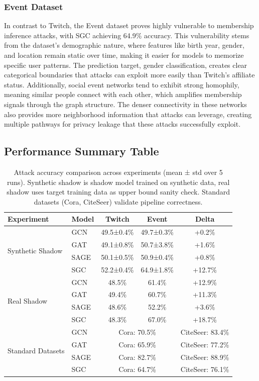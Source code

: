 \documentclass{article}
\begin{document}
\subsubsection{Event Dataset}
In contrast to Twitch, the Event dataset proves highly vulnerable to membership inference attacks, with SGC achieving 64.9\% accuracy. This vulnerability stems from the dataset's demographic nature, where features like birth year, gender, and location remain static over time, making it easier for models to memorize specific user patterns. The prediction target, gender classification, creates clear categorical boundaries that attacks can exploit more easily than Twitch's affiliate status. Additionally, social event networks tend to exhibit strong homophily, meaning similar people connect with each other, which amplifies membership signals through the graph structure. The denser connectivity in these networks also provides more neighborhood information that attacks can leverage, creating multiple pathways for privacy leakage that these attacks successfully exploit.

\subsection{Performance Summary Table}

\begin{table}[H]
\centering
\caption{Attack accuracy comparison across experiments (mean ± std over 5 runs). Synthetic shadow is shadow model trained on synthetic data, real shadow uses target training data as upper bound sanity check. Standard datasets (Cora, CiteSeer) validate pipeline correctness.}
\label{tab:performance}
\begin{tabular}{|l|l|c|c|c|}
\hline
\textbf{Experiment} & \textbf{Model} & \textbf{Twitch} & \textbf{Event} & \textbf{Delta} \\
\hline
\multirow{4}{*}{Synthetic Shadow} & GCN & 49.5±0.4\% & 49.7±0.3\% & +0.2\% \\
 & GAT & 49.1±0.8\% & 50.7±3.8\% & +1.6\% \\
 & SAGE & 50.1±0.5\% & 50.9±0.4\% & +0.8\% \\
 & SGC & 52.2±0.4\% & 64.9±1.8\% & +12.7\% \\
\hline
\multirow{4}{*}{Real Shadow} & GCN & 48.5\% & 61.4\% & +12.9\% \\
 & GAT & 49.4\% & 60.7\% & +11.3\% \\
 & SAGE & 48.6\% & 52.2\% & +3.6\% \\
 & SGC & 48.3\% & 67.0\% & +18.7\% \\
\hline
\multirow{4}{*}{Standard Datasets} & GCN & \multicolumn{2}{c|}{Cora: 70.5\%} & CiteSeer: 83.4\% \\
 & GAT & \multicolumn{2}{c|}{Cora: 65.9\%} & CiteSeer: 77.2\% \\
 & SAGE & \multicolumn{2}{c|}{Cora: 82.7\%} & CiteSeer: 88.9\% \\
 & SGC & \multicolumn{2}{c|}{Cora: 64.7\%} & CiteSeer: 76.1\% \\
\hline
\end{tabular}
\end{table}
\end{document}
